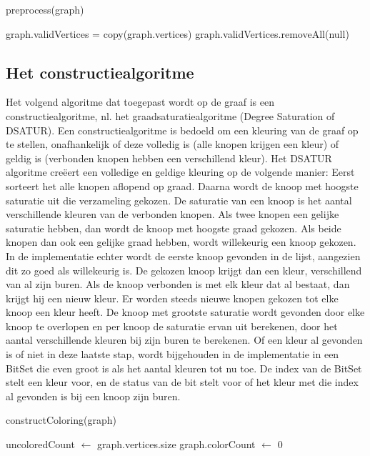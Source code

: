 \documentclass[a4paper,kulak]{kulakarticle} %
\begin{document}
\begin{function}
	\caption{preprocess(graph)}\label{func:preprocess}
	
	graph.validVertices = copy(graph.vertices)\;
	graph.validVertices.removeAll(null)\;
\end{function}

\subsection{Het constructiealgoritme}

Het volgend algoritme dat toegepast wordt op de graaf is een constructiealgoritme, nl. het graadsaturatiealgoritme (Degree Saturation of DSATUR). Een constructiealgoritme is bedoeld om een kleuring van de graaf op te stellen, onafhankelijk of deze volledig is (alle knopen krijgen een kleur) of geldig is (verbonden knopen hebben een verschillend kleur). Het DSATUR algoritme creëert een volledige en geldige kleuring op de volgende manier:
Eerst sorteert het alle knopen aflopend op graad. Daarna wordt de knoop met hoogste saturatie uit die verzameling gekozen. De saturatie van een knoop is het aantal verschillende kleuren van de verbonden knopen. Als twee knopen een gelijke saturatie hebben, dan wordt de knoop met hoogste graad gekozen. Als beide knopen dan ook een gelijke graad hebben, wordt willekeurig een knoop gekozen. In de implementatie echter wordt de eerste knoop gevonden in de lijst, aangezien dit zo goed als willekeurig is. De gekozen knoop krijgt dan een kleur, verschillend van al zijn buren. 
Als de knoop verbonden is met elk kleur dat al bestaat, dan krijgt hij een nieuw kleur. Er worden steeds nieuwe knopen gekozen tot elke knoop een kleur heeft.
De knoop met grootste saturatie wordt gevonden door elke knoop te overlopen en per knoop de saturatie ervan uit berekenen, door het aantal verschillende kleuren bij zijn buren te berekenen. Of een kleur al gevonden is of niet in deze laatste stap, wordt bijgehouden in de implementatie in een BitSet die even groot is als het aantal kleuren tot nu toe. De index van de BitSet stelt een kleur voor, en de status van de bit stelt voor of het kleur met die index al gevonden is bij een knoop zijn buren.

\begin{function}
	\caption{constructColoring(graph)}\label{func:constructColoring}
	
	uncoloredCount $\gets$ graph.vertices.size\;
	graph.colorCount $\gets$ 0\;
\end{function}
\end{document}
